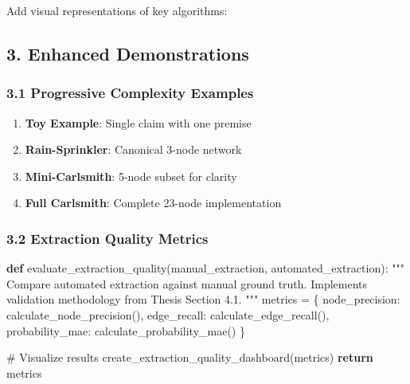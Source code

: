 \documentclass[
  11pt,
  letterpaper,
]{book}
\newenvironment{Shaded}{\begin{snugshade}}{\end{snugshade}}
\newcommand{\CommentTok}[1]{\textcolor[rgb]{0.37,0.37,0.37}{#1}}
\newcommand{\ControlFlowTok}[1]{\textcolor[rgb]{0.00,0.23,0.31}{\textbf{#1}}}
\newcommand{\KeywordTok}[1]{\textcolor[rgb]{0.00,0.23,0.31}{\textbf{#1}}}
\newcommand{\NormalTok}[1]{\textcolor[rgb]{0.00,0.23,0.31}{#1}}
\newcommand{\OperatorTok}[1]{\textcolor[rgb]{0.37,0.37,0.37}{#1}}
\newcommand{\StringTok}[1]{\textcolor[rgb]{0.13,0.47,0.30}{#1}}
\providecommand{\tightlist}{%
  \setlength{\itemsep}{0pt}\setlength{\parskip}{0pt}}
\begin{document}
Add visual representations of key algorithms:

\subsection{3. Enhanced Demonstrations}\label{enhanced-demonstrations}

\subsubsection{3.1 Progressive Complexity
Examples}\label{progressive-complexity-examples}

\begin{enumerate}
\def\labelenumi{\arabic{enumi}.}
\tightlist
\item
  \textbf{Toy Example}: Single claim with one premise
\item
  \textbf{Rain-Sprinkler}: Canonical 3-node network
\item
  \textbf{Mini-Carlsmith}: 5-node subset for clarity
\item
  \textbf{Full Carlsmith}: Complete 23-node implementation
\end{enumerate}

\subsubsection{3.2 Extraction Quality
Metrics}\label{extraction-quality-metrics}

\begin{Shaded}
\begin{Highlighting}[]
\KeywordTok{def}\NormalTok{ evaluate\_extraction\_quality(manual\_extraction, automated\_extraction):}
    \CommentTok{"""}
\CommentTok{    Compare automated extraction against manual ground truth.}
\CommentTok{    Implements validation methodology from Thesis Section 4.1.}
\CommentTok{    """}
\NormalTok{    metrics }\OperatorTok{=}\NormalTok{ \{}
        \StringTok{\textquotesingle{}node\_precision\textquotesingle{}}\NormalTok{: calculate\_node\_precision(),}
        \StringTok{\textquotesingle{}edge\_recall\textquotesingle{}}\NormalTok{: calculate\_edge\_recall(),}
        \StringTok{\textquotesingle{}probability\_mae\textquotesingle{}}\NormalTok{: calculate\_probability\_mae()}
\NormalTok{    \}}
    
    \CommentTok{\# Visualize results}
\NormalTok{    create\_extraction\_quality\_dashboard(metrics)}
    \ControlFlowTok{return}\NormalTok{ metrics}
\end{Highlighting}
\end{Shaded}
\end{document}
